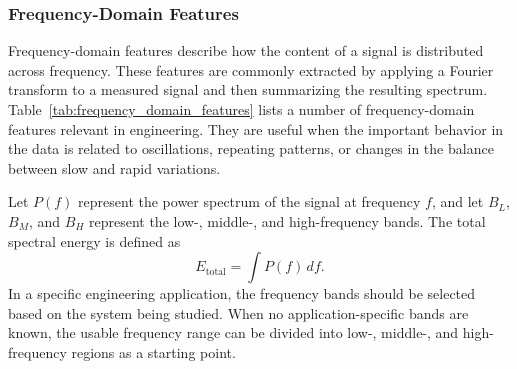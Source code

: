 \documentclass[12pt,letter]{article}
\begin{document}
\subsubsection{Frequency-Domain Features}

Frequency-domain features describe how the content of a signal is distributed across frequency. These features are commonly extracted by applying a Fourier transform to a measured signal and then summarizing the resulting spectrum. Table~\ref{tab:frequency_domain_features} lists a number of frequency-domain features relevant in engineering. They are useful when the important behavior in the data is related to oscillations, repeating patterns, or changes in the balance between slow and rapid variations. 

Let \(P(f)\) represent the power spectrum of the signal at frequency \(f\), and let \(B_L\), \(B_M\), and \(B_H\) represent the low-, middle-, and high-frequency bands. The total spectral energy is defined as
\begin{equation}
E_{\mathrm{total}} = \int P(f)\,df .
\end{equation}
In a specific engineering application, the frequency bands should be selected based on the system being studied. When no application-specific bands are known, the usable frequency range can be divided into low-, middle-, and high-frequency regions as a starting point.
\end{document}
